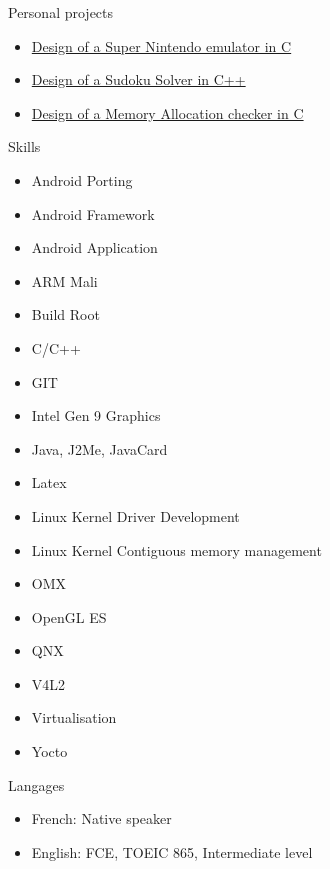 \documentclass[a4paper, 10pt]{article}
\begin{document}
\begin{unbreakableSection} {Personal projects}
    \begin{projects}
	\begin{itemize}[parsep=0cm,itemsep=0cm,topsep=0cm]
	    \item \href{https://github.com/grassead/snesemu}{Design of a Super Nintendo emulator in C}
	    \item \href{https://github.com/grassead/sudokusolver}{Design of a Sudoku Solver in C++}
	    \item \href{https://github.com/grassead/memorychecker}{Design of a Memory Allocation checker in C}
	\end{itemize}
    \end{projects}
\end{unbreakableSection}

\begin{section} {Skills}
    \begin{skills}
	\begin{itemize}[parsep=0cm,itemsep=0cm,topsep=0cm]
	    \item Android Porting
	    \item Android Framework
	    \item Android Application
	    \item ARM Mali
	    \item Build Root
	    \item C/C++
	    \item GIT
	    \item Intel Gen 9 Graphics
	    \item Java, J2Me, JavaCard
	    \item Latex
	    \item Linux Kernel Driver Development
	    \item Linux Kernel Contiguous memory management
	    \item OMX
	    \item OpenGL ES
	    \item QNX
	    \item V4L2
	    \item Virtualisation
	    \item Yocto
	\end{itemize}
    \end{skills}
\end{section}

\begin{section} {Langages}
    \begin{languages}
	\begin{itemize}[parsep=0cm,itemsep=0cm,topsep=0cm]
	    \item French: Native speaker
	    \item English: FCE, TOEIC 865, Intermediate level
	\end{itemize}
    \end{languages}
\end{section}
\end{document}
